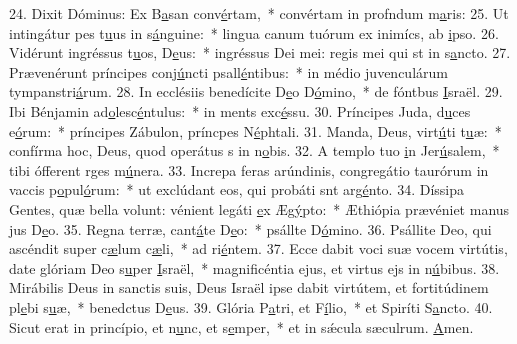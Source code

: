 24. Dixit Dóminus: Ex B\uline{a}san conv\uline{é}rtam,~* convértam in profndum m\uline{a}ris:
25. Ut intingátur pes t\uline{u}us in s\uline{á}nguine:~* lingua canum tuórum ex inimícs, ab \uline{i}pso.
26. Vidérunt ingréssus t\uline{u}os, D\uline{e}us:~* ingréssus Dei mei: regis mei qui st in s\uline{a}ncto.
27. Prævenérunt príncipes conj\uline{ú}ncti psall\uline{é}ntibus:~* in médio juvenculárum tympanstri\uline{á}rum.
28. In ecclésiis benedícite D\uline{e}o D\uline{ó}mino,~* de fóntbus \uline{I}sraël.
29. Ibi Bénjamin ad\uline{o}lesc\uline{é}ntulus:~* in ments exc\uline{é}ssu.
30. Príncipes Juda, d\uline{u}ces e\uline{ó}rum:~* príncipes Zábulon, príncpes N\uline{é}phtali.
31. Manda, Deus, virt\uline{ú}ti t\uline{u}æ:~* confírma hoc, Deus, quod operátus s in n\uline{o}bis.
32. A templo tuo \uline{i}n Jer\uline{ú}salem,~* tibi ófferent rges m\uline{ú}nera.
33. Increpa feras arúndinis, congregátio taurórum in vaccis p\uline{o}pul\uline{ó}rum:~* ut exclúdant eos, qui probáti snt arg\uline{é}nto.
34. Díssipa Gentes, quæ bella volunt: vénient legáti \uline{e}x Æg\uline{ý}pto:~* Æthiópia prævéniet manus jus D\uline{e}o.
35. Regna terræ, cant\uline{á}te D\uline{e}o:~* psállte D\uline{ó}mino.
36. Psállite Deo, qui ascéndit super c\uline{æ}lum c\uline{æ}li,~* ad ri\uline{é}ntem.
37. Ecce dabit voci suæ vocem virtútis, date glóriam Deo s\uline{u}per \uline{I}sraël,~* magnificéntia ejus, et virtus ejs in n\uline{ú}bibus.
38. Mirábilis Deus in sanctis suis, Deus Israël ipse dabit virtútem, et fortitúdinem pl\uline{e}bi s\uline{u}æ,~* benedctus D\uline{e}us.
39. Glória P\uline{a}tri, et F\uline{í}lio,~* et Spiríti S\uline{a}ncto.
40. Sicut erat in princípio, et n\uline{u}nc, et s\uline{e}mper,~* et in sǽcula sæculrum. \uline{A}men.
